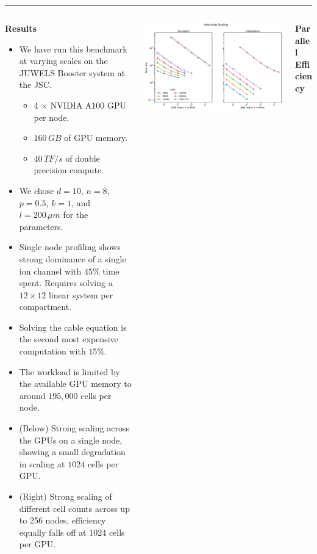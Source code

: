 \documentclass{beamer}
\begin{document}
\begin{frame}[t, fragile]
  \vspace*{1ex}
  \textcolor{arborange}{\rule{\textwidth}{0.5ex}}
  \vspace*{-1ex}
  \begin{columns}[t]
    \begin{column}[T]{0.25\textwidth}
      \textbf{Results}
      \begin{itemize}
        \item We have run this benchmark at varying scales on the JUWELS Booster
        system at the JSC.
        \begin{itemize}
          \item 4 $\times$ NVIDIA A100 GPU per node.
          \item $160\,GB$ of GPU memory.
          \item $40\, TF/s$ of double precision compute.
        \end{itemize}
        \item We chose $d=10$, $n=8$, $p=0.5$, $k=1$, and $l=200\,\mu m$ for the
              parameters.
        \item Single node profiling shows strong dominance of a single ion
              channel with $45\%$ time spent. Requires solving a
              $12\times 12$ linear system per compartment.
        \item Solving the cable equation is the second most expensive computation with $15\%$.
        \item The workload is limited by the available GPU memory to around
              $195,000$ cells per node.
        \item (Below) Strong scaling across the GPUs on a single node, showing a
              small degradation in scaling at $1024$ cells per GPU.
        \item (Right) Strong scaling of different cell counts across up to 256
              nodes, efficiency equally falls off at $1024$ cells per GPU.
      \end{itemize}
    \end{column}
    \begin{column}[T]{0.45\textwidth}
      \includegraphics[width=\textwidth]{internode}
    \end{column}
    \begin{column}[T]{0.25\textwidth}
      \textbf{Parallel Efficiency}


\end{column}
\end{columns}
\end{frame}
\end{document}

